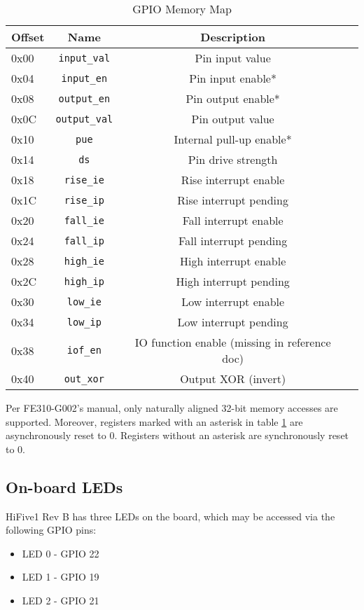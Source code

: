 \begin{table}[H]
    \centering
    \begin{tabular}{| p{3cm} | c | c | p{3cm} |}
        \hline
        \textbf{Offset} & \textbf{Name} & \textbf{Description}\\
        \hline
        \hline
        0x00 & \lstinline|input_val| & Pin input value\\
        0x04 & \lstinline|input_en| & Pin input enable*\\
        0x08 & \lstinline|output_en| & Pin output enable*\\
        0x0C & \lstinline|output_val| & Pin output value\\
        0x10 & \lstinline|pue| & Internal pull-up enable*\\
        0x14 & \lstinline|ds| & Pin drive strength\\
        0x18 & \lstinline|rise_ie| & Rise interrupt enable\\
        0x1C & \lstinline|rise_ip| & Rise interrupt pending\\
        0x20 & \lstinline|fall_ie| & Fall interrupt enable\\
        0x24 & \lstinline|fall_ip| & Fall interrupt pending\\
        0x28 & \lstinline|high_ie| & High interrupt enable\\
        0x2C & \lstinline|high_ip| & High interrupt pending\\
        0x30 & \lstinline|low_ie| & Low interrupt enable\\
        0x34 & \lstinline|low_ip| & Low interrupt pending\\
        0x38 & \lstinline|iof_en| & IO function enable (missing in reference doc)\\
        0x40 & \lstinline|out_xor| & Output XOR (invert)\\
        \hline
    \end{tabular}
    \caption{GPIO Memory Map}
    \label{tab:gpio_memory_map}
\end{table}

Per FE310-G002's manual\cite{fe310g002man}, only naturally aligned 32-bit memory accesses are supported. Moreover, registers marked with an asterisk in table \ref{tab:gpio_memory_map} are asynchronously reset to 0. Registers without an asterisk are synchronously reset to 0.

\subsection{On-board LEDs}
HiFive1 Rev B has three LEDs on the board, which may be accessed via the following GPIO pins:
\begin{itemize}
    \item LED 0 - GPIO 22
    \item LED 1 - GPIO 19
    \item LED 2 - GPIO 21
\end{itemize}